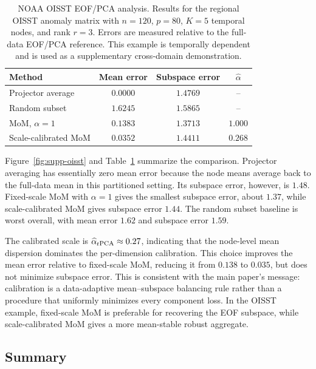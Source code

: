 \documentclass[11pt]{article}
\begin{document}
\begin{table}[ht!]
\centering
\caption{
{NOAA OISST EOF/PCA analysis.}
Results for the regional OISST anomaly matrix with \(n=120\), \(p=80\), \(K=5\) temporal nodes, and rank \(r=3\).  Errors are measured relative to the full-data EOF/PCA reference.  This example is temporally dependent and is used as a supplementary cross-domain demonstration.
}
\label{tab:supp-oisst}
\begin{tabular}{lccc}
\toprule
Method & Mean error & Subspace error & \(\widehat\alpha\) \\
\midrule
Projector average & \(0.0000\) & \(1.4769\) & -- \\
Random subset & \(1.6245\) & \(1.5865\) & -- \\
MoM, \(\alpha=1\) & \(0.1383\) & \(1.3713\) & \(1.000\) \\
Scale-calibrated MoM & \(0.0352\) & \(1.4411\) & \(0.268\) \\
\bottomrule
\end{tabular}
\end{table}

Figure~\ref{fig:supp-oisst} and Table~\ref{tab:supp-oisst} summarize the comparison.  Projector averaging has essentially zero mean error because the node means average back to the full-data mean in this partitioned setting.  Its subspace error, however, is \(1.48\).  Fixed-scale MoM with \(\alpha=1\) gives the smallest subspace error, about \(1.37\), while scale-calibrated MoM gives subspace error \(1.44\).  The random subset baseline is worst overall, with mean error \(1.62\) and subspace error \(1.59\).

The calibrated scale is \(\widehat\alpha_{\rm rPCA}\approx0.27\), indicating that the node-level mean dispersion dominates the per-dimension calibration.  This choice improves the mean error relative to fixed-scale MoM, reducing it from \(0.138\) to \(0.035\), but does not minimize subspace error.  This is consistent with the main paper's message: calibration is a data-adaptive mean--subspace balancing rule rather than a procedure that uniformly minimizes every component loss.  In the OISST example, fixed-scale MoM is preferable for recovering the EOF subspace, while scale-calibrated MoM gives a more mean-stable robust aggregate.





\subsection{Summary}
\end{document}
